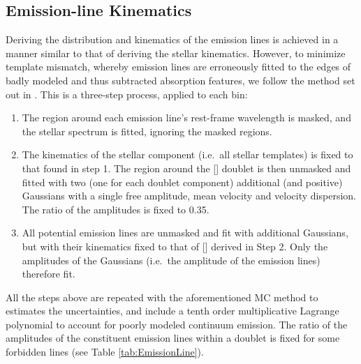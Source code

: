 

	\subsection{Emission-line Kinematics}
		\label{subsec:EmissionFit}
		Deriving the distribution and kinematics of the emission lines is achieved in a manner similar to that of deriving the stellar kinematics. However, to minimize template mismatch, whereby emission lines are erroneously fitted to the edges of badly modeled and thus subtracted absorption features, we follow the method set out in \citet{Sarzi2005}. This is a three-step process, applied to each bin:
		\begin{enumerate}
			\item The region around each emission line's rest-frame wavelength is masked, and the stellar spectrum is fitted, ignoring the masked regions.
			\item The kinematics of the stellar component (i.e.\ all stellar templates) is fixed to that found in step 1. The region around the [] doublet is then unmasked and fitted with two (one for each doublet component) additional (and positive) Gaussians with a single free amplitude, mean velocity and velocity dispersion. The ratio of the amplitudes is fixed to 0.35.
			\item All potential emission lines are unmasked and fit with additional Gaussians, but with their kinematics fixed to that of [] derived in Step 2. Only the amplitudes of the Gaussians (i.e.\ the amplitude of the emission lines) therefore fit. 
		\end{enumerate}
		All the steps above are repeated with the aforementioned MC method to estimates the uncertainties, and include a tenth order multiplicative Lagrange polynomial to account for poorly modeled continuum emission. The ratio of the amplitudes of the constituent emission lines within a doublet is fixed for some forbidden lines (see Table \ref{tab:EmissionLine}).


